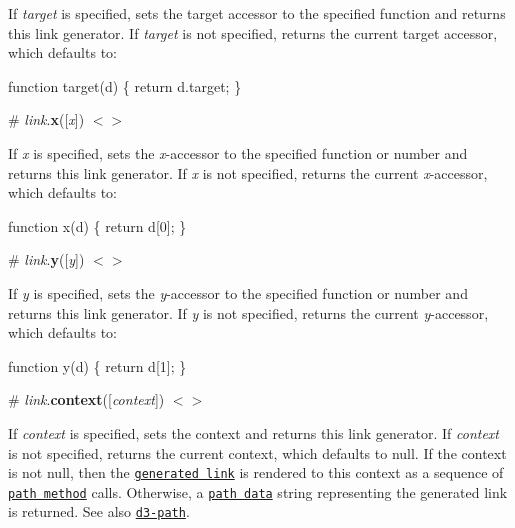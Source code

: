 If {\itshape target} is specified, sets the target accessor to the specified function and returns this link generator. If {\itshape target} is not specified, returns the current target accessor, which defaults to\+:


\begin{DoxyCode}
function target(d) \{
  return d.target;
\}
\end{DoxyCode}


\label{_link_x}%
\# {\itshape link}.{\bfseries x}(\mbox{[}{\itshape x}\mbox{]}) \href{https://github.com/d3/d3-shape/blob/master/src/link/index.js#L36}{\tt $<$$>$}

If {\itshape x} is specified, sets the {\itshape x}-\/accessor to the specified function or number and returns this link generator. If {\itshape x} is not specified, returns the current {\itshape x}-\/accessor, which defaults to\+:


\begin{DoxyCode}
function x(d) \{
  return d[0];
\}
\end{DoxyCode}


\label{_link_y}%
\# {\itshape link}.{\bfseries y}(\mbox{[}{\itshape y}\mbox{]}) \href{https://github.com/d3/d3-shape/blob/master/src/link/index.js#L40}{\tt $<$$>$}

If {\itshape y} is specified, sets the {\itshape y}-\/accessor to the specified function or number and returns this link generator. If {\itshape y} is not specified, returns the current {\itshape y}-\/accessor, which defaults to\+:


\begin{DoxyCode}
function y(d) \{
  return d[1];
\}
\end{DoxyCode}


\label{_link_context}%
\# {\itshape link}.{\bfseries context}(\mbox{[}{\itshape context}\mbox{]}) \href{https://github.com/d3/d3-shape/blob/master/src/link/index.js#L44}{\tt $<$$>$}

If {\itshape context} is specified, sets the context and returns this link generator. If {\itshape context} is not specified, returns the current context, which defaults to null. If the context is not null, then the \href{#_link}{\tt generated link} is rendered to this context as a sequence of \href{http://www.w3.org/TR/2dcontext/#canvaspathmethods}{\tt path method} calls. Otherwise, a \href{http://www.w3.org/TR/SVG/paths.html#PathData}{\tt path data} string representing the generated link is returned. See also \href{https://github.com/d3/d3-path}{\tt d3-\/path}.

